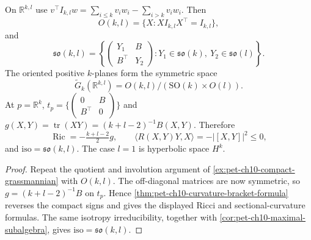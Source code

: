 \begin{example}
  \label{ex:pet-ch10-hyperbolic-grassmannian}

  On $\mathbb R^{k,l}$ use
  $v^\top I_{k,l}w=\sum_{i\le k}v_iw_i-\sum_{i>k}v_iw_i$. Then
  \[
    O(k,l)=\{X:XI_{k,l}X^\top=I_{k,l}\},
  \]
  and
  \[
    \mathfrak{so}(k,l)
    =\left\{\begin{pmatrix}Y_1&B\\B^\top&Y_2\end{pmatrix}:
      Y_1\in\mathfrak{so}(k),\ Y_2\in\mathfrak{so}(l)\right\}.
  \]
  The oriented positive $k$-planes form the symmetric space
  \[
    \widetilde G_k(\mathbb R^{k,l})
      =O(k,l)/(\mathrm{SO}(k)\times O(l)).
  \]
  At $p=\mathbb R^k$,
  $t_p=\{\left(\begin{smallmatrix}0&B\\B^\top&0\end{smallmatrix}\right)\}$ and
  $g(X,Y)=\operatorname{tr}(XY)=(k+l-2)^{-1}B(X,Y)$. Therefore
  \[
    \operatorname{Ric}=-\tfrac{k+l-2}2g,\qquad
    \langle R(X,Y)Y,X\rangle=-|[X,Y]|^2\le0,
  \]
  and $\mathrm{iso}=\mathfrak{so}(k,l)$. The case $l=1$ is hyperbolic space
  $H^k$.
\end{example}
\begin{proof}
  \sketch
  Repeat the quotient and involution argument of
  \cref{ex:pet-ch10-compact-grassmannian} with $O(k,l)$. The off-diagonal
  matrices are now symmetric, so
  $g=(k+l-2)^{-1}B$ on $t_p$. Hence
  \cref{thm:pet-ch10-curvature-bracket-formula} reverses the compact signs and
  gives the displayed Ricci and sectional-curvature formulas. The same
  isotropy irreducibility, together with
  \cref{cor:pet-ch10-maximal-subalgebra}, gives
  $\mathrm{iso}=\mathfrak{so}(k,l)$.
\end{proof}

